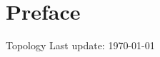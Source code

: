 \documentclass[10pt,oneside,openany]{memoir}
\begin{document}
    \chapter*{Preface}
    Topology
    \vspace{-25pt}
    \tableofcontents
    \vfill
    \specialdate
    Last update: \today

    
    
    
\end{document}
